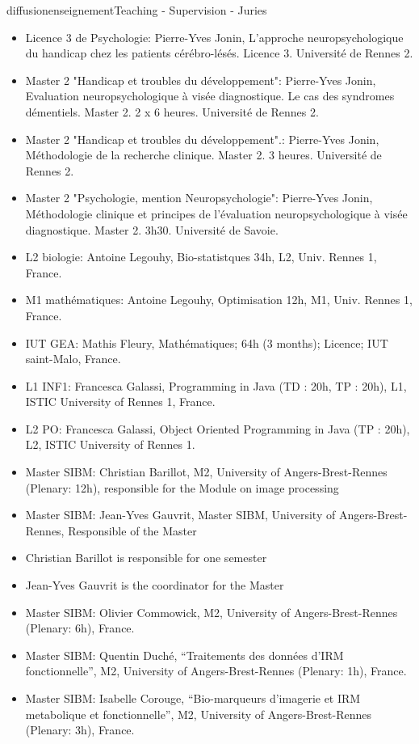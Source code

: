 \documentclass{ra2018}
\begin{document}
\begin{module}{diffusion}{enseignement}{Teaching - Supervision - Juries}
\begin{itemize}
    \item Licence 3 de Psychologie: Pierre-Yves Jonin, L'approche neuropsychologique du handicap chez les patients cérébro-lésés. Licence 3. Université de Rennes 2.
    \item Master 2 "Handicap et troubles du développement": Pierre-Yves Jonin, Evaluation neuropsychologique à visée diagnostique. Le cas des syndromes démentiels. Master 2. 2 x 6 heures. Université de Rennes 2.
    \item Master 2 "Handicap et troubles du développement".: Pierre-Yves Jonin, Méthodologie de la recherche clinique. Master 2. 3 heures. Université de Rennes 2.
    \item Master 2 "Psychologie, mention Neuropsychologie": Pierre-Yves Jonin, Méthodologie clinique et principes de l’évaluation neuropsychologique à visée diagnostique. Master 2. 3h30. Université de Savoie.
    \item L2 biologie: Antoine Legouhy, Bio-statistques 34h, L2, Univ. Rennes 1, France.
    \item M1 mathématiques: Antoine Legouhy, Optimisation 12h, M1, Univ. Rennes 1, France.
    \item IUT GEA: Mathis Fleury, Mathématiques; 64h (3 months); Licence; IUT saint-Malo, France.
    \item L1 INF1: Francesca Galassi, Programming in Java (TD : 20h, TP : 20h), L1, ISTIC University of Rennes 1, France.
    \item L2 PO: Francesca Galassi, Object Oriented Programming in Java (TP : 20h), L2, ISTIC University of Rennes 1.
    \item Master SIBM: Christian Barillot, M2, University of Angers-Brest-Rennes (Plenary: 12h), responsible for the Module on image processing
    \item Master SIBM: Jean-Yves Gauvrit, Master SIBM, University of Angers-Brest-Rennes, Responsible of the Master
    \item Christian Barillot is responsible for one semester
    \item Jean-Yves Gauvrit is the coordinator for the Master
    \item Master SIBM: Olivier Commowick, M2, University of Angers-Brest-Rennes (Plenary: 6h), France.
    \item Master SIBM: Quentin Duché, ``Traitements des données d'IRM fonctionnelle'', M2, University of Angers-Brest-Rennes (Plenary: 1h), France.
    \item Master SIBM: Isabelle Corouge, ``Bio-marqueurs d’imagerie et IRM metabolique et fonctionnelle'', M2, University of Angers-Brest-Rennes (Plenary: 3h), France.

\end{itemize}
\end{module}
\end{document}

